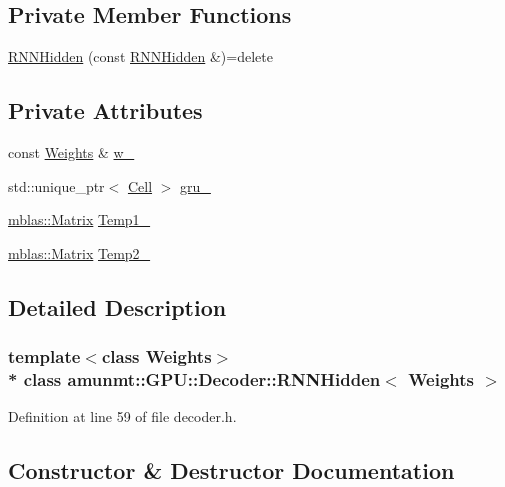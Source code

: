 \subsection*{Private Member Functions}
\begin{DoxyCompactItemize}
\item 
\hyperlink{classamunmt_1_1GPU_1_1Decoder_1_1RNNHidden_a4ea4b32b4268f35782f0d72972e8c804}{R\+N\+N\+Hidden} (const \hyperlink{classamunmt_1_1GPU_1_1Decoder_1_1RNNHidden}{R\+N\+N\+Hidden} \&)=delete
\end{DoxyCompactItemize}
\subsection*{Private Attributes}
\begin{DoxyCompactItemize}
\item 
const \hyperlink{structamunmt_1_1GPU_1_1Weights}{Weights} \& \hyperlink{classamunmt_1_1GPU_1_1Decoder_1_1RNNHidden_a96f70b0f258c493213bccb861f0014d0}{w\+\_\+}
\item 
std\+::unique\+\_\+ptr$<$ \hyperlink{classamunmt_1_1GPU_1_1Cell}{Cell} $>$ \hyperlink{classamunmt_1_1GPU_1_1Decoder_1_1RNNHidden_adb4c82513eebad0bf15fc30e80a773c5}{gru\+\_\+}
\item 
\hyperlink{namespaceamunmt_1_1GPU_1_1mblas_ab67821a8254de53e45a623cf73c0aef6}{mblas\+::\+Matrix} \hyperlink{classamunmt_1_1GPU_1_1Decoder_1_1RNNHidden_a1a68b1758b067423c6727404933caa4f}{Temp1\+\_\+}
\item 
\hyperlink{namespaceamunmt_1_1GPU_1_1mblas_ab67821a8254de53e45a623cf73c0aef6}{mblas\+::\+Matrix} \hyperlink{classamunmt_1_1GPU_1_1Decoder_1_1RNNHidden_a19dc15b3feae837ac18e9014cffc4a9d}{Temp2\+\_\+}
\end{DoxyCompactItemize}


\subsection{Detailed Description}
\subsubsection*{template$<$class Weights$>$\\*
class amunmt\+::\+G\+P\+U\+::\+Decoder\+::\+R\+N\+N\+Hidden$<$ Weights $>$}



Definition at line 59 of file decoder.\+h.



\subsection{Constructor \& Destructor Documentation}
